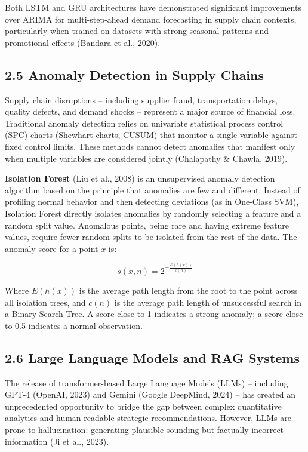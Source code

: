 \documentclass[12pt, a4paper]{report}
\begin{document}
Both LSTM and GRU architectures have demonstrated significant improvements over ARIMA for multi-step-ahead demand forecasting in supply chain contexts, particularly when trained on datasets with strong seasonal patterns and promotional effects (Bandara et al., 2020).

\subsection{2.5 Anomaly Detection in Supply Chains}

Supply chain disruptions -- including supplier fraud, transportation delays, quality defects, and demand shocks -- represent a major source of financial loss. Traditional anomaly detection relies on univariate statistical process control (SPC) charts (Shewhart charts, CUSUM) that monitor a single variable against fixed control limits. These methods cannot detect anomalies that manifest only when multiple variables are considered jointly (Chalapathy \& Chawla, 2019).

\textbf{Isolation Forest} (Liu et al., 2008) is an unsupervised anomaly detection algorithm based on the principle that anomalies are few and different. Instead of profiling normal behavior and then detecting deviations (as in One-Class SVM), Isolation Forest directly isolates anomalies by randomly selecting a feature and a random split value. Anomalous points, being rare and having extreme feature values, require fewer random splits to be isolated from the rest of the data. The anomaly score for a point $x$ is:

\begin{equation}
s(x, n) = 2^{-\frac{E(h(x))}{c(n)}}
\end{equation}

Where $E(h(x))$ is the average path length from the root to the point across all isolation trees, and $c(n)$ is the average path length of unsuccessful search in a Binary Search Tree. A score close to 1 indicates a strong anomaly; a score close to 0.5 indicates a normal observation.

\subsection{2.6 Large Language Models and RAG Systems}

The release of transformer-based Large Language Models (LLMs) -- including GPT-4 (OpenAI, 2023) and Gemini (Google DeepMind, 2024) -- has created an unprecedented opportunity to bridge the gap between complex quantitative analytics and human-readable strategic recommendations. However, LLMs are prone to hallucination: generating plausible-sounding but factually incorrect information (Ji et al., 2023).
\end{document}
